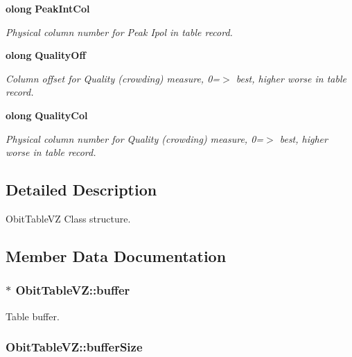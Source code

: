 \begin{CompactItemize}
{\bf olong} {\bf Peak\-Int\-Col}
\begin{CompactList}\small\item\em Physical column number for Peak Ipol in table record. \item\end{CompactList}\item 
{\bf olong} {\bf Quality\-Off}
\begin{CompactList}\small\item\em Column offset for Quality (crowding) measure, 0=$>$ best, higher worse in table record. \item\end{CompactList}\item 
{\bf olong} {\bf Quality\-Col}
\begin{CompactList}\small\item\em Physical column number for Quality (crowding) measure, 0=$>$ best, higher worse in table record. \item\end{CompactList}\end{CompactItemize}


\subsection{Detailed Description}
Obit\-Table\-VZ Class structure. 



\subsection{Member Data Documentation}
\subsubsection{$\ast$ {\bf Obit\-Table\-VZ::buffer}}\label{structObitTableVZ_o10}


Table buffer. 

\subsubsection{ {\bf Obit\-Table\-VZ::buffer\-Size}}\label{structObitTableVZ_o11}



